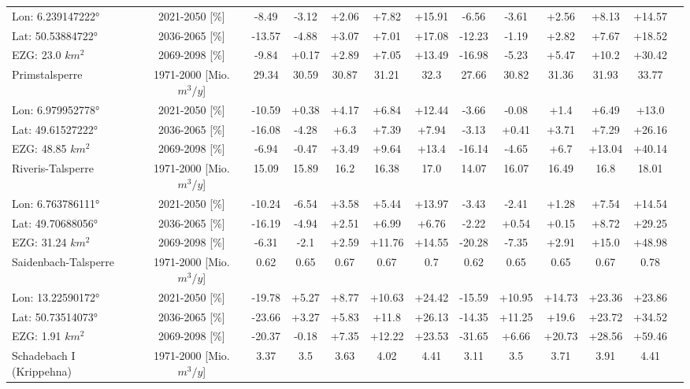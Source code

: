 \begin{longtable}{@{\extracolsep{\fill}}lc|ccccc||cccccc}
\cline{2-13} 
Lon: 6.239147222° & 2021-2050 [\%]  & -8.49 & -3.12 & +2.06 & +7.82 & +15.91 & -6.56 & -3.61 & +2.56 & +8.13 & +14.57 & \\ 
Lat: 50.53884722° & 2036-2065 [\%]  & -13.57 & -4.88 & +3.07 & +7.01 & +17.08 & -12.23 & -1.19 & +2.82 & +7.67 & +18.52 & \\ 
EZG: 23.0 $km^2$ & 2069-2098 [\%]  & -9.84 & +0.17 & +2.89 & +7.05 & +13.49 & -16.98 & -5.23 & +5.47 & +10.2 & +30.42 & \\ 
\hline 
Primstalsperre & 1971-2000 [Mio. $m^3/y$]  & 29.34 & 30.59 & 30.87 & 31.21 & 32.3 & 27.66 & 30.82 & 31.36 & 31.93 & 33.77 & \\ 
\cline{2-13} 
Lon: 6.979952778° & 2021-2050 [\%]  & -10.59 & +0.38 & +4.17 & +6.84 & +12.44 & -3.66 & -0.08 & +1.4 & +6.49 & +13.0 & \\ 
Lat: 49.61527222° & 2036-2065 [\%]  & -16.08 & -4.28 & +6.3 & +7.39 & +7.94 & -3.13 & +0.41 & +3.71 & +7.29 & +26.16 & \\ 
EZG: 48.85 $km^2$ & 2069-2098 [\%]  & -6.94 & -0.47 & +3.49 & +9.64 & +13.4 & -16.14 & -4.65 & +6.7 & +13.04 & +40.14 & \\ 
\hline 
Riveris-Talsperre & 1971-2000 [Mio. $m^3/y$]  & 15.09 & 15.89 & 16.2 & 16.38 & 17.0 & 14.07 & 16.07 & 16.49 & 16.8 & 18.01 & \\ 
\cline{2-13} 
Lon: 6.763786111° & 2021-2050 [\%]  & -10.24 & -6.54 & +3.58 & +5.44 & +13.97 & -3.43 & -2.41 & +1.28 & +7.54 & +14.54 & \\ 
Lat: 49.70688056° & 2036-2065 [\%]  & -16.19 & -4.94 & +2.51 & +6.99 & +6.76 & -2.22 & +0.54 & +0.15 & +8.72 & +29.25 & \\ 
EZG: 31.24 $km^2$ & 2069-2098 [\%]  & -6.31 & -2.1 & +2.59 & +11.76 & +14.55 & -20.28 & -7.35 & +2.91 & +15.0 & +48.98 & \\ 
\hline 
Saidenbach-Talsperre & 1971-2000 [Mio. $m^3/y$]  & 0.62 & 0.65 & 0.67 & 0.67 & 0.7 & 0.62 & 0.65 & 0.65 & 0.67 & 0.78 & \\ 
\cline{2-13} 
Lon: 13.22590172° & 2021-2050 [\%]  & -19.78 & +5.27 & +8.77 & +10.63 & +24.42 & -15.59 & +10.95 & +14.73 & +23.36 & +23.86 & \\ 
Lat: 50.73514073° & 2036-2065 [\%]  & -23.66 & +3.27 & +5.83 & +11.8 & +26.13 & -14.35 & +11.25 & +19.6 & +23.72 & +34.52 & \\ 
EZG: 1.91 $km^2$ & 2069-2098 [\%]  & -20.37 & -0.18 & +7.35 & +12.22 & +23.53 & -31.65 & +6.66 & +20.73 & +28.56 & +59.46 & \\ 
\hline 
Schadebach I (Krippehna) & 1971-2000 [Mio. $m^3/y$]  & 3.37 & 3.5 & 3.63 & 4.02 & 4.41 & 3.11 & 3.5 & 3.71 & 3.91 & 4.41 & \\ 

\end{longtable}
